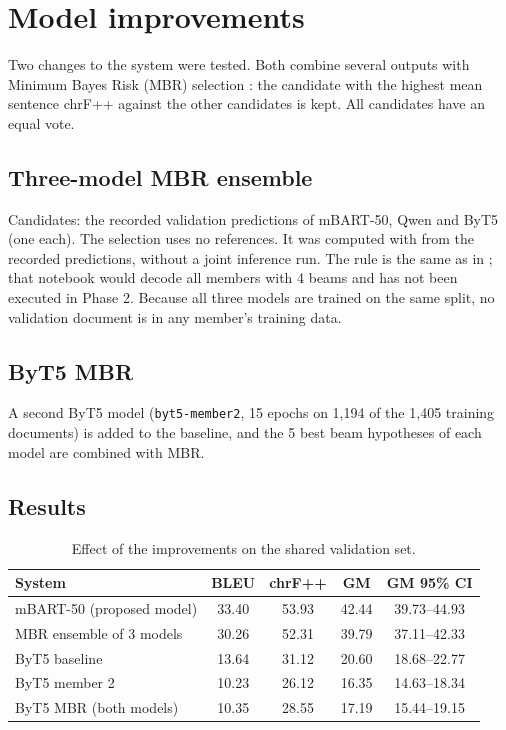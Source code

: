 \documentclass[a4paper,12pt]{article}
\begin{document}
\section{Model improvements}
\label{sec:improvements}
Two changes to the system were tested. Both combine several outputs with Minimum Bayes Risk (MBR) selection \cite{mbr}: the candidate with the highest mean sentence chrF++ against the other candidates is kept. All candidates have an equal vote.

\subsection{Three-model MBR ensemble}
Candidates: the recorded validation predictions of mBART-50, Qwen and ByT5 (one each). The selection uses no references. It was computed with  from the recorded predictions, without a joint inference run. The rule is the same as in ; that notebook would decode all members with 4 beams and has not been executed in Phase 2. Because all three models are trained on the same split, no validation document is in any member's training data.

\subsection{ByT5 MBR}
A second ByT5 model (\texttt{byt5-member2}, 15 epochs on 1{,}194 of the 1{,}405 training documents) is added to the baseline, and the 5 best beam hypotheses of each model are combined with MBR.

\subsection{Results}
\begin{table}[H]
    \centering
    \caption{Effect of the improvements on the shared validation set.}
    \label{tab:improvements}
    \begin{tabular}{lcccc}
        \toprule
        \textbf{System} & \textbf{BLEU} & \textbf{chrF++} & \textbf{GM} & \textbf{GM 95\% CI} \\
        \midrule
        mBART-50 (proposed model) & 33.40 & 53.93 & 42.44 & 39.73--44.93 \\
        MBR ensemble of 3 models & 30.26 & 52.31 & 39.79 & 37.11--42.33 \\
        \midrule
        ByT5 baseline & 13.64 & 31.12 & 20.60 & 18.68--22.77 \\
        ByT5 member 2 & 10.23 & 26.12 & 16.35 & 14.63--18.34 \\
        ByT5 MBR (both models) & 10.35 & 28.55 & 17.19 & 15.44--19.15 \\
        \bottomrule
    \end{tabular}
\end{table}
\end{document}
